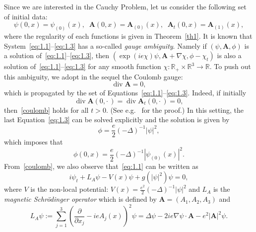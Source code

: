 \documentclass[10pt]{amsart}
\theoremstyle{definition}\newtheorem{defi}[theo]{Definition}\newtheorem{rema}[theo]{Remark}\newtheorem{exam}[theo]{Example}\newtheorem{exem}[theo]{Example}\newtheorem{nota}[theo]{Notation}
\newcommand{\BA}{\mathbf{A}}
\newcommand{\R}{\mathbb{R}}
\DeclareMathOperator{\Div}{div}
\begin{document}
Since we are interested in the Cauchy Problem, let us consider the following set of initial data:
\begin{equation}\label{initial}
\psi(0,x) =\psi_{(0)}(x), \;\; \BA (0,x)=\BA_{(0)}(x), \;\; \BA_t(0,x)=\BA_{(1)}(x),
\end{equation}
where the regularity of each functions is given in Theorem~\ref{th1}. It is known that System~\eqref{eq:1.1}--\eqref{eq:1.3} has a so-called \emph{gauge ambiguity}. Namely if $(\psi,\BA, \phi)$ is a solution of~\eqref{eq:1.1}--\eqref{eq:1.3}, then $(\exp(i e \chi)\psi,\BA+\nabla \chi, \phi-\chi_t)$ is also a solution of~\eqref{eq:1.1}--\eqref{eq:1.3} for any smooth function $\chi:\R_+ \times \R^3 \to \R$. To push out this ambiguity, we adopt in the sequel the Coulomb gauge:
\begin{equation}\label{coulomb}
\Div \BA=0,
\end{equation}
which is propagated by the set of Equations~\eqref{eq:1.1}--\eqref{eq:1.3}. Indeed, if initially
\[
\Div \BA(0,{\cdot\,})= \Div \BA_t (0,{\cdot\,})=0,
\]
then~\eqref{coulomb} holds for all $t>0$. (See e.g.~\cite{CW1} for the proof.) In this setting, the last Equation~\eqref{eq:1.3} can be solved explicitly and the solution is given by
\[
\phi=\frac{e}{2}(-\Delta)^{-1}|\psi|^2,
\]
which imposes that
\[
\phi(0,x) = \frac{e}{2}(-\Delta)^{-1}|\psi_{(0)}(x)|^2.
\]
From~\eqref{coulomb}, we also observe that~\eqref{eq:1.1} can be written as
\begin{equation}\label{MS}
i \psi_t + L_A \psi - V(x) \psi + g(|\psi|^2)\psi =0,
\end{equation}
where $V$ is the non-local potential: $V(x)=\frac{e^2}{2} (-\Delta)^{-1} |\psi|^2$ and $L_A$ is the \emph{magnetic Schr\"odinger operator} which is defined by $\BA=(A_1,A_2,A_3)$ and
\begin{equation}\label{mag}
L_A \psi := \sum_{j=1}^3 \left(\frac{\partial}{\partial x_j}-ieA_j(x) \right)^2 \psi = \Delta \psi - 2ie \nabla \psi \cdot \BA - e^2 |\BA|^2 \psi.
\end{equation}
\end{document}
